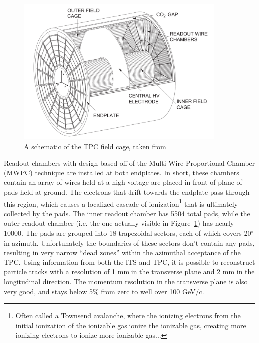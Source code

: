 \begin{figure}
    \centering
    \includegraphics[width=0.9\textwidth]{figures/experiment/tpc_schematic.png}
    \caption{A schematic of the TPC field cage, taken from~\cite{TPC1}}
    \label{fig:tpc_schematic}
\end{figure}

Readout chambers with design based off of the Multi-Wire Proportional Chamber (MWPC) technique are installed at both endplates. In short, these chambers contain an array of wires held at a high voltage are placed in front of plane of pads held at ground. The electrons that drift towards the endplate pass through this region, which causes a localized cascade of ionization\footnote{Often called a Townsend avalanche, where the ionizing electrons from the initial ionization of the ionizable gas ionize the ionizable gas, creating more ionizing electrons to ionize more ionizable gas...} that is ultimately collected by the pads. The inner readout chamber has 5504 total pads, while the outer readout chamber (i.e. the one actually visible in Figure~\ref{fig:tpc_schematic}) has nearly 10000. The pads are grouped into 18 trapezoidal sectors, each of which covers 20$^\circ$ in azimuth. Unfortunately the boundaries of these sectors don't contain any pads, resulting in very narrow ``dead zones'' within the azimuthal acceptance of the TPC. Using information from both the ITS and TPC, it is possible to reconstruct particle tracks with a resolution of 1 mm in the transverse plane and 2 mm in the longitudinal direction. The momentum resolution in the transverse plane is also very good, and stays below 5\% from zero to well over 100 GeV/c.

